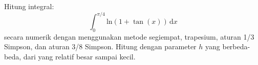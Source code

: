 \documentclass[12pt]{article}
\begin{document}
\thispagestyle{empty}

Hitung integral:
$$
\int_{0}^{\pi/4} \mathrm{ln}\left(1 + \tan(x)\right)\,\mathrm{d}x
$$
secara numerik dengan menggunakan metode segiempat, trapesium, aturan 1/3 Simpson, dan aturan 3/8
Simpson. Hitung dengan parameter $h$ yang berbeda-beda, dari yang relatif besar sampai kecil.
\end{document}
